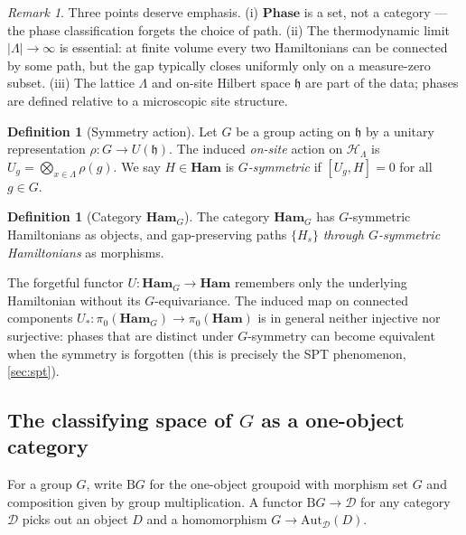 \documentclass[12pt]{article}
\theoremstyle{plain}
\theoremstyle{definition}
\newtheorem{definition}[theorem]{Definition}
\theoremstyle{remark}
\newtheorem{remark}[theorem]{Remark}
\newcommand{\Ham}{\mathbf{Ham}}
\newcommand{\Phase}{\mathbf{Phase}}
\newcommand{\BG}{\mathrm{B}G}
\begin{document}
\begin{remark}
Three points deserve emphasis. (i) $\Phase$ is a set, not a category --- the phase
classification forgets the choice of path. (ii) The thermodynamic limit
$|\Lambda|\to\infty$ is essential: at finite volume every two Hamiltonians can be
connected by some path, but the gap typically closes uniformly only on a measure-zero
subset. (iii) The lattice $\Lambda$ and on-site Hilbert space $\mathfrak{h}$ are part
of the data; phases are defined relative to a microscopic site structure.
\end{remark}

\begin{definition}[Symmetry action]
\label{def:sym-action}
Let $G$ be a group acting on $\mathfrak{h}$ by a unitary representation
$\rho:G\to U(\mathfrak{h})$. The induced \emph{on-site} action on $\mathcal{H}_{\Lambda}$
is $U_{g}=\bigotimes_{x\in\Lambda}\rho(g)$. We say $H\in\Ham$ is \emph{$G$-symmetric}
if $[U_{g},H]=0$ for all $g\in G$.
\end{definition}

\begin{definition}[Category $\Ham_{G}$]
\label{def:HamG}
The category $\Ham_{G}$ has $G$-symmetric Hamiltonians as objects, and gap-preserving
paths $\{H_{s}\}$ \emph{through $G$-symmetric Hamiltonians} as morphisms.
\end{definition}

The forgetful functor $U:\Ham_{G}\to\Ham$ remembers only the underlying Hamiltonian
without its $G$-equivariance. The induced map on connected components
$U_{*}:\pi_{0}(\Ham_{G})\to\pi_{0}(\Ham)$ is in general neither injective nor
surjective: phases that are distinct under $G$-symmetry can become equivalent when the
symmetry is forgotten (this is precisely the SPT phenomenon, \cref{sec:spt}).

\subsection{The classifying space of $G$ as a one-object category}

For a group $G$, write $\BG$ for the one-object groupoid with morphism set $G$ and
composition given by group multiplication. A functor $\BG\to\mathcal{D}$ for any category
$\mathcal{D}$ picks out an object $D$ and a homomorphism $G\to\mathrm{Aut}_{\mathcal{D}}(D)$.
\end{document}
